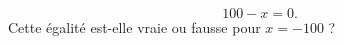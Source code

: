 
\begin{mental}
\begin{equation}
    100-x=0.
\end{equation}
Cette égalité est-elle vraie ou fausse pour \( x=-100\) ?
\end{mental}

